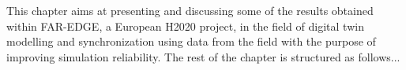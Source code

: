 This chapter aims at presenting and discussing some of the results obtained within FAR-EDGE, a European H2020 project, in the field of digital twin modelling and synchronization using data from the field with the purpose of improving simulation reliability. 
The rest of the chapter is structured as follows...







